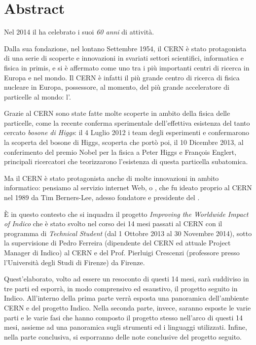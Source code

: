 \cleardoublepage
{}
\chapter*{Abstract}

	Nel 2014 il  ha celebrato i suoi \textit{60 anni} di attività.
	
	Dalla sua fondazione, nel lontano Settembre 1954, il \ac{CERN} è stato protagonista di una serie di scoperte e innovazioni in svariati settori scientifici, informatica e fisica in primis, e si è affermato come uno tra i più importanti centri di ricerca in Europa e nel mondo. Il \ac{CERN} è infatti il più grande centro di ricerca di fisica nucleare in Europa, possessore, al momento, del più grande acceleratore di particelle al mondo: l'.
	
	Grazie al \ac{CERN} sono state fatte molte scoperte in ambito della fisica delle particelle, come la recente conferma sperimentale dell'effettiva esistenza del tanto cercato \textit{bosone di Higgs}: il 4 Luglio 2012 i team degli esperimenti  e  confermarono la scoperta del bosone di Higgs, scoperta che portò poi, il 10 Dicembre 2013, al conferimento del premio Nobel per la fisica a Peter Higgs e François Englert, principali ricercatori che teorizzarono l'esistenza di questa particella subatomica.
	
	Ma il \ac{CERN} è stato protagonista anche di molte innovazioni in ambito informatico: pensiamo al servizio internet Web, o , che fu ideato proprio al \ac{CERN} nel 1989 da Tim Berners-Lee, adesso fondatore e presidente del .
	
	È in questo contesto che si inquadra il progetto \textit{Improving the Worldwide Impact of Indico} che è stato svolto nel corso dei 14 mesi passati al \ac{CERN} con il programma di \textit{Technical Student} (dal 1 Ottobre 2013 al 30 Novembre 2014), sotto la supervisione di Pedro Ferreira (dipendente del \ac{CERN} ed attuale Project Manager di Indico) al \ac{CERN} e del Prof. Pierluigi Crescenzi (professore presso l'Università degli Studi di Firenze) da Firenze.
	
	Quest'elaborato, volto ad essere un resoconto di questi 14 mesi, sarà suddiviso in tre parti ed esporrà, in modo comprensivo ed esaustivo, il progetto seguito in Indico. All'interno della prima parte verrà esposta una panoramica dell'ambiente \ac{CERN} e del progetto Indico. Nella seconda parte, invece, saranno esposte le varie parti e le varie fasi che hanno composto il progetto stesso nell'arco di questi 14 mesi, assieme ad una panoramica sugli strumenti ed i linguaggi utilizzati. Infine, nella parte conclusiva, si esporranno delle note conclusive del progetto seguito.
	